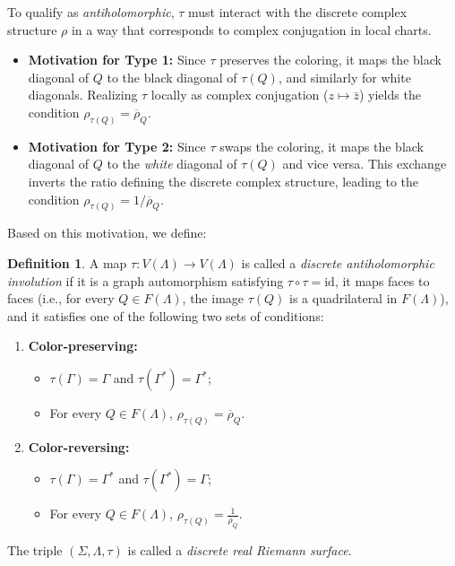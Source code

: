 \documentclass[11pt,a4paper]{article}
\theoremstyle{definition}
\newtheorem*{definition}{Definition}
\begin{document}
To qualify as \emph{antiholomorphic}, $\tau$ must interact with the discrete complex structure $\rho$ in a way that corresponds to complex conjugation in local charts.
\begin{itemize}
	\item \textbf{Motivation for Type 1:} Since $\tau$ preserves the coloring, it maps the black diagonal of $Q$ to the black diagonal of $\tau(Q)$, and similarly for white diagonals. Realizing $\tau$ locally as complex conjugation ($z \mapsto \bar{z}$) yields the condition $\rho_{\tau(Q)} = \overline{\rho}_Q$.
	\item \textbf{Motivation for Type 2:} Since $\tau$ swaps the coloring, it maps the black diagonal of $Q$ to the \emph{white} diagonal of $\tau(Q)$ and vice versa. This exchange inverts the ratio defining the discrete complex structure, leading to the condition $\rho_{\tau(Q)} = 1/\overline{\rho}_Q$.
\end{itemize}

Based on this motivation, we define:

\begin{definition} \label{def:discrete_real_RS}
	A map $\tau : V(\Lambda) \to V(\Lambda)$ is called a \emph{discrete antiholomorphic involution} if it is a graph automorphism satisfying $\tau \circ \tau = \mathrm{id}$, it maps faces to faces (i.e., for every $Q \in F(\Lambda)$, the image $\tau(Q)$ is a quadrilateral in $F(\Lambda)$), and it satisfies one of the following two sets of conditions:
	\begin{enumerate}
		\item[(i)] \textbf{Color-preserving:}
		\begin{itemize}
			\item $\tau(\Gamma) = \Gamma$ and $\tau(\Gamma^*) = \Gamma^*$;
			\item For every $Q \in F(\Lambda)$, $\rho_{\tau(Q)} = \overline{\rho}_{Q}$.
		\end{itemize}
		\item[(ii)] \textbf{Color-reversing:}
		\begin{itemize}
			\item $\tau(\Gamma) = \Gamma^*$ and $\tau(\Gamma^*) = \Gamma$;
			\item For every $Q \in F(\Lambda)$, $\rho_{\tau(Q)} = \frac{1}{\overline{\rho}_{Q}}$.
		\end{itemize}
	\end{enumerate}
	The triple $(\Sigma, \Lambda, \tau)$ is called a \emph{discrete real Riemann surface}.
\end{definition}
\end{document}
